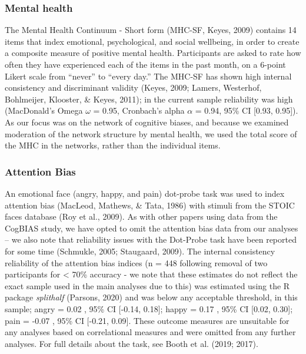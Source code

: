 \documentclass[
  english,
  man]{apa6}
\begin{document}
\hypertarget{mental-health}{%
\subsubsection{Mental health}\label{mental-health}}

The Mental Health Continuum - Short form (MHC-SF, Keyes, 2009) contains 14 items that index emotional, psychological, and social wellbeing, in order to create a composite measure of positive mental health. Participants are asked to rate how often they have experienced each of the items in the past month, on a 6-point Likert scale from ``never'' to ``every day.'' The MHC-SF has shown high internal consistency and discriminant validity (Keyes, 2009; Lamers, Westerhof, Bohlmeijer, Klooster, \& Keyes, 2011); in the current sample reliability was high (MacDonald's Omega \(\omega\) = 0.95, Cronbach's alpha \(\alpha\) = 0.94, 95\% CI {[}0.93, 0.95{]}). As our focus was on the network of cognitive biases, and because we examined moderation of the network structure by mental health, we used the total score of the MHC in the networks, rather than the individual items.

\hypertarget{attention-bias}{%
\subsubsection{Attention Bias}\label{attention-bias}}

An emotional face (angry, happy, and pain) dot-probe task was used to index attention bias (MacLeod, Mathews, \& Tata, 1986) with stimuli from the STOIC faces database (Roy et al., 2009). As with other papers using data from the CogBIAS study, we have opted to omit the attention bias data from our analyses -- we also note that reliability issues with the Dot-Probe task have been reported for some time (Schmukle, 2005; Staugaard, 2009). The internal consistency reliability of the attention bias indices (n = 448 following removal of two participants for \textless{} 70\% accuracy - we note that these estimates do not reflect the exact sample used in the main analyses due to this) was estimated using the R package \emph{splithalf} (Parsons, 2020) and was below any acceptable threshold, in this sample; angry = 0.02 , 95\% CI {[}-0.14, 0.18{]}; happy = 0.17 , 95\% CI {[}0.02, 0.30{]}; pain = -0.07 , 95\% CI {[}-0.21, 0.09{]}. These outcome measures are unsuitable for any analyses based on correlational measures and were omitted from any further analyses. For full details about the task, see Booth et al. (2019; 2017).
\end{document}

